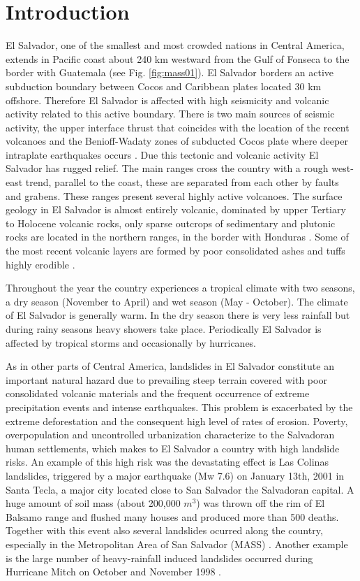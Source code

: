 \documentclass[11pt,twoside]{rmta2010esp}%
\begin{document}
\section{Introduction}
\label{sec:intr}
El Salvador, one of the smallest and most crowded nations in Central America, extends in Pacific coast about 240 km westward from the Gulf of Fonseca to the border with Guatemala (see Fig. \ref{fig:mass01}). El Salvador borders an active subduction boundary between Cocos and Caribbean plates located 30 km offshore. Therefore El Salvador is affected with high seismicity and volcanic activity related to this active boundary. There is two main sources of seismic activity, the upper interface thrust that coincides with the location of the recent volcanoes and the Benioff-Wadaty zones of subducted Cocos plate where deeper intraplate earthquakes occurs \cite{dewey}. Due this tectonic and volcanic activity El Salvador has rugged relief. The main ranges cross the country with a rough west-east trend, parallel to the coast, these are separated from each other by faults and grabens. These ranges present several highly active volcanoes. The surface geology in El Salvador is almost entirely volcanic, dominated by upper Tertiary to Holocene volcanic rocks, only sparse outcrops of sedimentary and plutonic rocks are located in the northern ranges, in the border with Honduras \cite{weber}. Some of the most recent volcanic layers are formed by poor consolidated ashes and tuffs highly erodible \cite{bommer}.

Throughout the year the country experiences a tropical climate with two seasons, a dry season (November to April) and wet season (May - October). The climate of El Salvador is generally warm. In the dry season there is very less rainfall but during rainy seasons heavy showers take place. Periodically El Salvador is affected by tropical storms and occasionally by hurricanes.

As in other parts of Central America, landslides in El Salvador constitute an important natural hazard due to prevailing steep terrain covered with poor consolidated volcanic materials and the frequent occurrence of extreme precipitation events and intense earthquakes. This problem is exacerbated by the extreme deforestation and the consequent high level of rates of erosion. Poverty, overpopulation and uncontrolled urbanization characterize to the Salvadoran human settlements, which makes to El Salvador a country with high landslide risks. An example of this high risk was the devastating effect is Las Colinas landslides,  triggered by a major earthquake (Mw 7.6) on January 13th, 2001 in Santa Tecla, a major city located close to San Salvador the Salvadoran capital\cite{evans}. A huge amount of soil mass (about 200,000 $m^{3}$) was thrown off the rim of El Balsamo range and flushed many houses and produced more than 500 deaths. Together with this event also several landslides ocurred along the country, especially in the Metropolitan Area of San Salvador (MASS) \cite{jibson}. Another example is the large number of heavy-rainfall induced landslides occurred during Hurricane Mitch on October and November 1998 \cite{crone}.   
\end{document}
